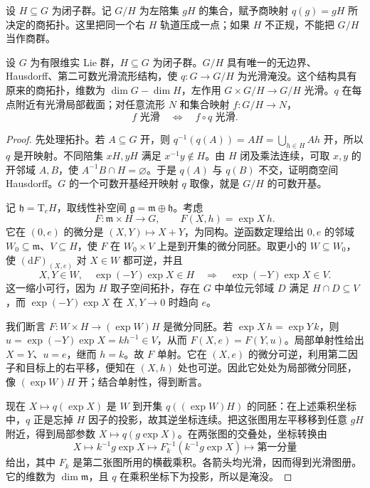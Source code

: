 设 \(H\subseteq G\) 为闭子群。记 \(G/H\) 为左陪集 \(gH\) 的集合，赋予商映射 \(q(g)=gH\) 所决定的商拓扑。这里把同一个右 \(H\) 轨道压成一点；如果 \(H\) 不正规，不能把 \(G/H\) 当作商群。

\begin{theorem}\label{g1:thm:homogeneous-space}
	设 \(G\) 为有限维实 Lie 群，\(H\subseteq G\) 为闭子群。\(G/H\) 具有唯一的无边界、Hausdorff、第二可数光滑流形结构，使 \(q:G\to G/H\) 为光滑淹没。这个结构具有原来的商拓扑，维数为 \(\dim G-\dim H\)，左作用 \(G\times G/H\to G/H\) 光滑。\(q\) 在每点附近有光滑局部截面；对任意流形 \(N\) 和集合映射 \(f:G/H\to N\)，
	\[
		f\text{ 光滑}\quad\Longleftrightarrow\quad f\circ q\text{ 光滑}.
	\]
\end{theorem}
\begin{proof}
	先处理拓扑。若 \(A\subseteq G\) 开，则 \(q^{-1}(q(A))=AH=\bigcup_{h\in H}Ah\) 开，所以 \(q\) 是开映射。不同陪集 \(xH,yH\) 满足 \(x^{-1}y\notin H\)。由 \(H\) 闭及乘法连续，可取 \(x,y\) 的开邻域 \(A,B\)，使 \(A^{-1}B\cap H=\varnothing\)。于是 \(q(A)\) 与 \(q(B)\) 不交，证明商空间 Hausdorff。\(G\) 的一个可数开基经开映射 \(q\) 取像，就是 \(G/H\) 的可数开基。

	记 \(\mathfrak h=\mathrm{T}_eH\)，取线性补空间 \(\mathfrak g=\mathfrak m\oplus\mathfrak h\)。考虑
	\[
		F:\mathfrak m\times H\longrightarrow G,
		\qquad F(X,h)=\exp X\,h.
	\]
	它在 \((0,e)\) 的微分是 \((X,Y)\mapsto X+Y\)，为同构。逆函数定理给出 \(0,e\) 的邻域 \(W_0\subseteq\mathfrak m\)、\(V\subseteq H\)，使 \(F\) 在 \(W_0\times V\) 上是到开集的微分同胚。取更小的 \(W\subseteq W_0\)，使 \((\mathrm{d}F)_{(X,e)}\) 对 \(X\in W\) 都可逆，并且
	\[
		X,Y\in W,\quad \exp(-Y)\exp X\in H
		\quad\Longrightarrow\quad \exp(-Y)\exp X\in V.
	\]
	这一缩小可行，因为 \(H\) 取子空间拓扑，存在 \(G\) 中单位元邻域 \(D\) 满足 \(H\cap D\subseteq V\)，而 \(\exp(-Y)\exp X\) 在 \(X,Y\to0\) 时趋向 \(e\)。

	我们断言 \(F:W\times H\to (\exp W)H\) 是微分同胚。若 \(\exp X\,h=\exp Y\,k\)，则 \(u=\exp(-Y)\exp X=kh^{-1}\in V\)，从而 \(F(X,e)=F(Y,u)\)。局部单射性给出 \(X=Y\)、\(u=e\)，继而 \(h=k\)。故 \(F\) 单射。它在 \((X,e)\) 的微分可逆，利用第二因子和目标上的右平移，便知在 \((X,h)\) 处也可逆。因此它处处为局部微分同胚，像 \((\exp W)H\) 开；结合单射性，得到断言。

	现在 \(X\mapsto q(\exp X)\) 是 \(W\) 到开集 \(q((\exp W)H)\) 的同胚：在上述乘积坐标中，\(q\) 正是忘掉 \(H\) 因子的投影，故其逆坐标连续。把这张图用左平移移到任意 \(gH\) 附近，得到局部参数 \(X\mapsto q(g\exp X)\)。在两张图的交叠处，坐标转换由
	\[
		X\longmapsto k^{-1}g\exp X
		\longmapsto F_k^{-1}(k^{-1}g\exp X)
		\longmapsto\text{第一分量}
	\]
	给出，其中 \(F_k\) 是第二张图所用的横截乘积。各箭头均光滑，因而得到光滑图册。它的维数为 \(\dim\mathfrak m\)，且 \(q\) 在乘积坐标下为投影，所以是淹没。


\end{proof}
